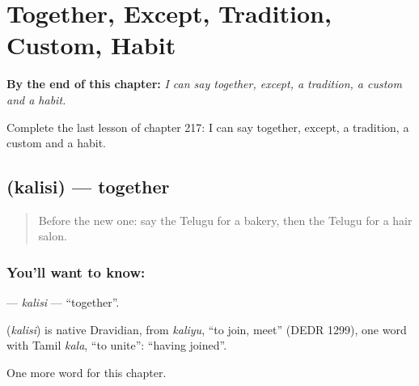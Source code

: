 
\chapter{Together, Except, Tradition, Custom, Habit}
\label{ch:te-together-except-tradition-custom-habit}

\begin{chapteropening}
\textbf{By the end of this chapter:} \emph{I can say together, except, a tradition, a custom and a habit.}

Complete the last lesson of chapter 217: I can say together, except, a tradition, a custom and a habit.
\end{chapteropening}

\section[\texorpdfstring{\te{కలిసి} (kalisi)}{కలిసి (kalisi)}]{ (kalisi) — together}

\label{lesson:TE-C217-kalisi}



\begin{quote}
Before the new one: say the Telugu for a bakery, then the Telugu for a hair salon.
\end{quote}

\subsection*{You'll want to know: }
\textbf{} — \emph{kalisi} — \textquotedblleft{}together\textquotedblright{}.

\begin{cousinweb}
\textbf{} (\emph{kalisi}) is native Dravidian, from \emph{kaliyu}, \textquotedblleft{}to join, meet\textquotedblright{} (DEDR 1299), one word with Tamil \emph{kala}, \textquotedblleft{}to unite\textquotedblright{}: \textquotedblleft{}having joined\textquotedblright{}.
\end{cousinweb}

\begin{grammarlens}[title={What you've built}]
One more word for this chapter.
\end{grammarlens}

